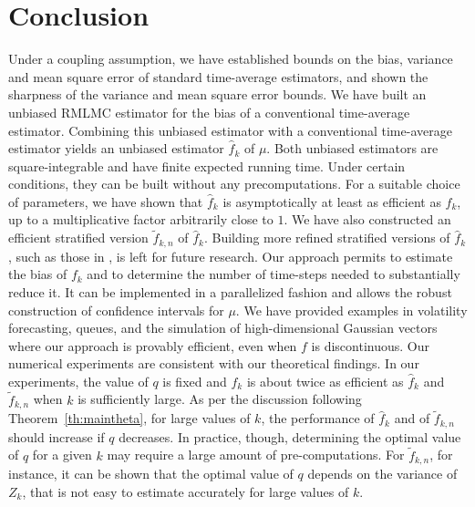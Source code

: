 \documentclass[a4paper,11pt]{article}
\begin{document}
\section{Conclusion}
Under a coupling assumption, we have established bounds on the bias, variance and mean square error of standard time-average estimators, and shown the sharpness of the variance and mean square error bounds. We have  built an unbiased RMLMC estimator for the bias of a conventional time-average estimator. Combining this unbiased estimator with a conventional time-average estimator yields an unbiased estimator  \(\hat f_{k}\)  of \(\mu\).  Both unbiased estimators are square-integrable  and have finite expected running time. Under certain conditions, they can be built  without any precomputations. For a suitable choice of parameters, we have shown that   \(\hat f_{k}\) is  asymptotically at least as efficient as \(f_{k}\), up to a multiplicative factor arbitrarily close to \(1\). We have also constructed an efficient stratified version \(\tilde f_{k,n}\) of    \(\hat f_{k}\). Building more refined stratified versions of    \(\hat f_{k}\),  such as those in \cite{Vihola2018}, is left for future research. Our approach permits to estimate
the bias of \(f_{k}\) and to determine the number of time-steps needed to substantially reduce it. It  can be implemented in a parallelized fashion and allows the robust construction of confidence intervals for \(\mu\). We have provided examples in  volatility forecasting,  queues, and  the simulation of high-dimensional Gaussian vectors where our approach is provably efficient, even when \(f\) is discontinuous. Our numerical experiments are consistent with our theoretical findings. In our experiments, the value  of \(q\) is fixed
and   \(f_{k}\) is about twice as efficient as  \(\hat f_{k}\) and  \(\tilde f_{k,n}\)  when \(k\) is sufficiently large.  As per the discussion following Theorem~\ref{th:maintheta}, for large values of \(k\), the performance of     \(\hat f_{k}\) and of    \(\tilde f_{k,n}\)   should increase if  \(q\) decreases. In practice, though, determining the optimal value of \(q\) for a given \(k\) may require a large amount of pre-computations. For     \(\tilde f_{k,n}\), for instance, it can be shown that the optimal value of \(q\) depends on the variance of \(Z_k\), that is not easy to estimate accurately for large values of \(k\).
\appendix
\end{document}
